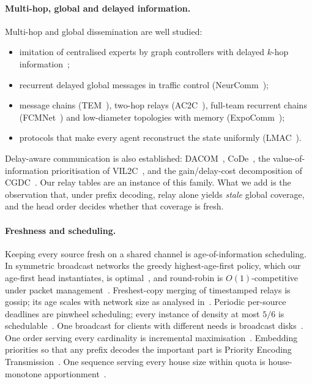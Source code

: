 \documentclass[11pt]{article}
\theoremstyle{definition}
\begin{document}
\paragraph{Multi-hop, global and delayed information.} Multi-hop and global dissemination are well studied:
\begin{itemize}
\item imitation of centralised experts by graph controllers with delayed $k$-hop information~\cite{gama2022,tolstaya2019};
\item recurrent delayed global messages in traffic control (NeurComm~\cite{neurcomm});
\item message chains (TEM~\cite{tem}), two-hop relays (AC2C~\cite{ac2c}), full-team recurrent chains
(FCMNet~\cite{fcmnet}) and low-diameter topologies with memory (ExpoComm~\cite{expocomm});
\item protocols that make every agent reconstruct the state uniformly (LMAC~\cite{lmac}).
\end{itemize}
Delay-aware communication is also established: DACOM~\cite{dacom}, CoDe~\cite{code}, the value-of-information
prioritisation of VIL2C~\cite{vil2c}, and the gain/delay-cost decomposition of CGDC~\cite{cgdc}. Our relay tables are
an instance of this family. What we add is the observation that, under prefix decoding, relay alone yields
\emph{stale} global coverage, and the head order decides whether that coverage is fresh.
\paragraph{Freshness and scheduling.} Keeping every source fresh on a shared channel is age-of-information scheduling.
In symmetric broadcast networks the greedy highest-age-first policy, which our age-first head instantiates, is
optimal~\cite{kadota2018}, and round-robin is $O(1)$-competitive under packet management~\cite{jien2023}. Freshest-copy
merging of timestamped relays is gossip; its age scales with network size as analysed in~\cite{yates2021,selen2013}.
Periodic per-source deadlines are pinwheel scheduling; every instance of density at most $5/6$ is
schedulable~\cite{kawamura2024}. One broadcast for clients with different needs is broadcast disks~\cite{broadcastdisks}.
One order serving every cardinality is incremental maximisation~\cite{bernstein2022,bienkowski2026}. Embedding
priorities so that any prefix decodes the important part is Priority Encoding Transmission~\cite{pet}. One sequence
serving every house size within quota is house-monotone apportionment~\cite{balinski1982}.
\end{document}
